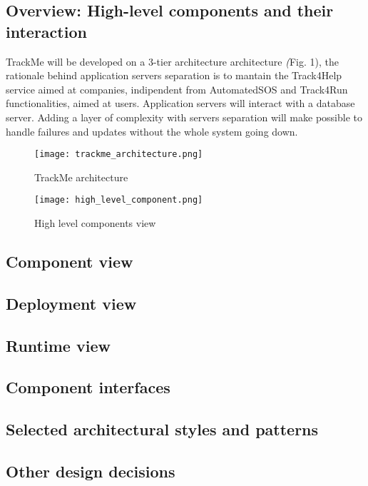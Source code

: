\documentclass[../main.tex]{subfiles}
\begin{document}
\subsection{Overview: High-level components and their interaction}
 TrackMe will be developed on a 3-tier architecture architecture \textit(Fig. 1), the rationale behind application servers separation is to mantain the Track4Help service
 aimed at companies, indipendent from AutomatedSOS and Track4Run functionalities, aimed at users. Application servers will interact with a database server.  Adding a layer of complexity with servers separation will  make 
 possible to handle failures and updates without the whole system going down.


  \begin{figure}[ht]
    \centering
         \texttt{[image: trackme\_architecture.png]}
          \caption{TrackMe architecture}
           \label{fig:trackme_architecture}
    \end{figure}

    \begin{figure}[ht]
        \centering
             \texttt{[image: high\_level\_component.png]}
              \caption{High level components view}
               \label{fig:high_level_components}
        \end{figure}
 
\subsection{Component view}

\subsection{Deployment view}

\subsection{Runtime view}

\subsection{Component interfaces}

\subsection{Selected architectural styles and patterns}

\subsection{Other design decisions}
\end{document}
